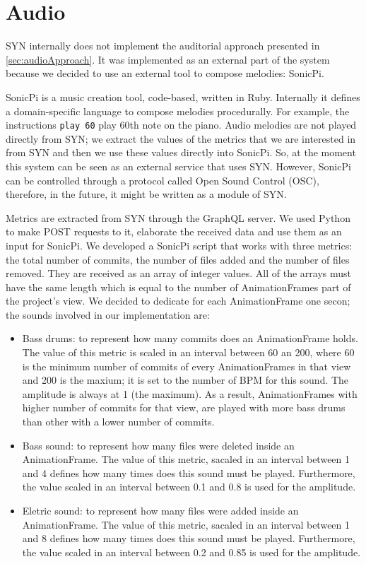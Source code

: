 \section{Audio}
SYN internally does not implement the auditorial approach presented in \autoref{sec:audioApproach}. It was implemented as an external part of the system because we decided to use an external tool to compose melodies: SonicPi. 

SonicPi is a music creation tool, code-based, written in Ruby. Internally it defines a domain-specific language to compose melodies procedurally. For example, the instructions \texttt{play 60} play 60th note on the piano. Audio melodies are not played directly from SYN; we extract the values of the metrics that we are interested in from SYN and then we use these values directly into SonicPi. So, at the moment this system can be seen as an external service that uses SYN. However, SonicPi can be controlled through a protocol called Open Sound Control (OSC), therefore, in the future, it might be written as a module of SYN. 

Metrics are extracted from SYN through the GraphQL server. We used Python to make POST requests to it, elaborate the received data and use them as an input for SonicPi. We developed a SonicPi script that works with three metrics: the total number of commits, the number of files added and the number of files removed. They are received as an array of integer values. All of the arrays must have the same length which is equal to the number of AnimationFrames part of the project's view. We decided to dedicate for each AnimationFrame one secon; the sounds involved in our implementation are:
\begin{itemize}
    \item Bass drums: to represent how many commits does an AnimationFrame holds. The value of this metric is scaled in an interval between 60 an 200, where 60 is the minimum number of commits of every AnimationFrames in that view and 200 is the maxium; it is set to the number of BPM for this sound. The amplitude is always at 1 (the maximum). As a result, AnimationFrames with higher number of commits for that view, are played with more bass drums than other with a lower number of commits.
    \item Bass sound: to represent how many files were deleted inside an AnimationFrame. The value of this metric, sacaled in an interval between 1 and 4 defines how many times does this sound must be played. Furthermore, the value scaled in an interval between 0.1 and 0.8 is used for the amplitude. 
    \item Eletric sound: to represent how many files were added inside an AnimationFrame. The value of this metric, sacaled in an interval between 1 and 8 defines how many times does this sound must be played. Furthermore, the value scaled in an interval between 0.2 and 0.85 is used for the amplitude. 
\end{itemize}

